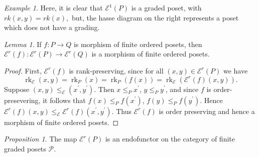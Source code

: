 \documentclass[10 pt]{amsart}
\theoremstyle{plain}
\theoremstyle{definition}
\theoremstyle{remark}
\numberwithin{equation}{section}
\newtheorem{lem}[thm]{Lemma}
\newtheorem{prop}[thm]{Proposition}
\theoremstyle{remark}
\newtheorem{eg}[thm]{Example}
\newcommand\rk{\operatorname{rk}}
\begin{document}
\begin{eg}
\iffalse
\newline
\begin{tikzpicture}[scale=.7]
  \node (one) at (90:2cm) {$6$};
  \node (b) at (150:2cm) {$4$};
  \node (a) at (210:2cm) {$2$};
  \node (zero) at (270:2cm) {$1$};
  \node (c) at (330:2cm) {$3$};
  \node (d) at (30:2cm) {$5$};
  \draw (zero) -- (a) -- (b) -- (one) -- (d) -- (c) -- (zero);
\end{tikzpicture}
\begin{tikzpicture}[scale=.7]
  \node (one) at (60:2cm) {$(5, 6)$};
  \node (b) at (120:2cm) {$(4, 6)$};
  \node (a) at (180:2cm) {$(2, 4)$};
  \node (zero) at (240:2cm) {$(1, 2)$};
  \node (c) at (300:2cm) {$(1,3)$};
  \node (d) at (0:2cm) {$(3, 5)$};
  \draw (zero) -- (a) -- (b);
  \draw (c)--(d)--(one);
\end{tikzpicture}
\begin{tikzpicture}[scale=.7]
  \node (one) at (60:2cm) {$(5, 6)$};
  \node (b) at (120:2cm) {$(4, 6)$};
  \node (a) at (180:2cm) {$(2, 4)$};
  \node (zero) at (240:2cm) {$(1, 2)$};
  \node (c) at (300:2cm) {$(1, 3)$};
  \node (d) at (0:2cm) {$(3, 5)$};
  \draw (zero) -- (a) -- (b) -- (c)--(d)--(one) -- (zero);
\end{tikzpicture}
\fi
Here, it is clear that $\mathcal E^1(P)$ is a graded poset, with $rk(x,y) = rk(x),$ but, the hasse diagram on the right represents a poset which does not have a grading.
\end{eg}


\begin{lem}\label{lem:Ff_poset_morphism}
If $f\colon P\rightarrow Q$ is morphism of finite ordered posets, then $\mathcal E^r(f)\colon \mathcal E^r(P)\rightarrow \mathcal E^r(Q)$ is a morphism of finite ordered posets.
\end{lem}

\begin{proof}
First, $\mathcal E^r(f)$ is rank-preserving, since for all $(x, y)\in \mathcal E^r(P)$ we have 
$$\rk_{\mathcal E}(x, y) = \rk_P(x) = \rk_P(f(x)) = \rk_{\mathcal E}(\mathcal E^r(f)(x, y)).$$
Suppose $(x, y)\le_{\mathcal E} (x^\prime, y^\prime)$.  Then $x\le_P x^\prime$, $y\le_P y^\prime$, and since $f$ is order-presevering, it follows that $f(x)\le_P f(x^\prime)$, $f(y)\le_P f(y^\prime)$. Hence $\mathcal E^r(f)(x,y) \le_{\mathcal E} \mathcal E^r(f)(x^\prime , y^\prime)$.  Thus $\mathcal E^r(f)$ is order preserving and hence a morphism of finite ordered posets.
\end{proof}

\begin{prop}\label{prop:F_well_defined}
The map $\mathcal E^r(P)$ is an endofunctor on the category of finite graded posets $\mathcal{P}$.
\end{prop}
\end{document}
